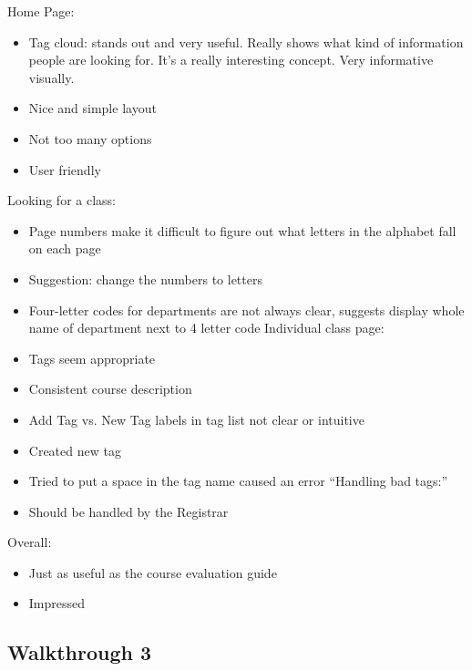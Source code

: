 \documentclass[12pt]{report}
\begin{document}
Home Page:
\begin{itemize}
\item Tag cloud: stands out and very useful. Really shows what kind of information people are looking for. It's a really interesting concept. Very informative visually.
\item Nice and simple layout
\item Not too many options
\item User friendly 
\end{itemize}
Looking for a class:
\begin{itemize}
\item Page numbers make it difficult to figure out what letters in the alphabet fall on each page
\item Suggestion: change the numbers to letters
\item Four-letter codes for departments are not always clear, suggests display whole name of department next to 4 letter code Individual class page:
\item Tags seem appropriate
\item Consistent course description
\item Add Tag vs. New Tag labels in tag list not clear or intuitive
\item Created new tag
\item Tried to put a space in the tag name caused an error ``Handling bad tags:''
\item Should be handled by the Registrar 
\end{itemize}
Overall:
\begin{itemize}
\item Just as useful as the course evaluation guide
\item Impressed
\end{itemize}

\subsection{Walkthrough 3}
\end{document}
